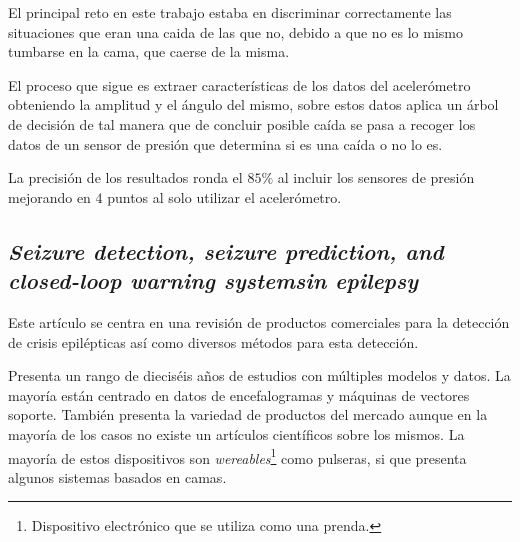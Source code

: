El principal reto en este trabajo estaba en discriminar correctamente las situaciones que eran una caida de las que no, debido a que no es lo mismo tumbarse en la cama, que caerse de la misma. 

El proceso que sigue es extraer características de los datos del acelerómetro obteniendo la amplitud y el ángulo del mismo, sobre estos datos aplica un árbol de decisión de tal manera que de concluir posible caída se pasa a recoger los datos de un sensor de presión que determina si es una caída o no lo es.

La precisión de los resultados ronda el $85\%$ al incluir los sensores de presión mejorando en $4$ puntos al solo utilizar el acelerómetro.

\subsection{\textit{\textbf{Seizure detection, seizure prediction, and closed-loop warning systemsin epilepsy}}~\cite{ramgopal2014product_review}}

Este artículo se centra en una revisión de productos comerciales para la detección de crisis epilépticas así como diversos métodos para esta detección.

Presenta un rango de dieciséis años de estudios con múltiples modelos y datos. La mayoría están centrado en datos de encefalogramas y máquinas de vectores soporte. También presenta la variedad de productos del mercado aunque en la mayoría de los casos no existe un artículos científicos sobre los mismos. La mayoría de estos dispositivos son \textit{wereables}\footnote{Dispositivo electrónico que se utiliza como una prenda.} como pulseras, si que presenta algunos sistemas basados en camas.